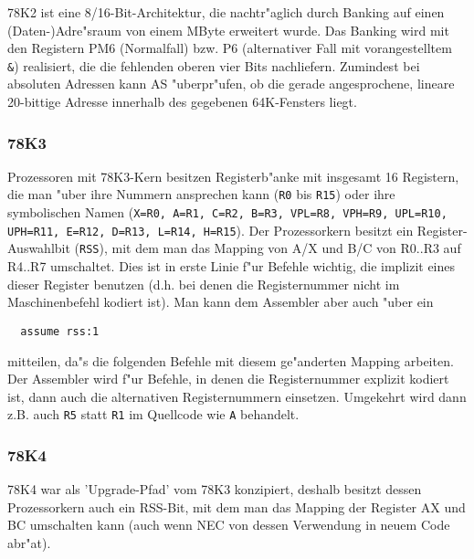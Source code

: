 \documentclass[12pt,a4paper,twoside]{report}
\newcommand{\tty}[1]{{\tt #1}}
\begin{document}
78K2 ist eine 8/16-Bit-Architektur, die nachtr"aglich durch Banking auf
einen (Daten-)Adre"sraum von einem MByte erweitert wurde.  Das Banking
wird mit den Registern PM6 (Normalfall) bzw. P6 (alternativer Fall mit
vorangestelltem \verb!&!) realisiert, die die fehlenden oberen vier Bits
nachliefern.  Zumindest bei absoluten Adressen kann AS "uberpr"ufen, ob
die gerade angesprochene, lineare 20-bittige Adresse innerhalb des
gegebenen 64K-Fensters liegt.


\subsubsection{78K3}

Prozessoren mit 78K3-Kern besitzen Registerb"anke mit insgesamt 16 Registern,
die man "uber ihre Nummern ansprechen kann (\tty{R0} bis \tty{R15}) oder ihre symbolischen
Namen (\tty{X=R0, A=R1, C=R2, B=R3, VPL=R8, VPH=R9, UPL=R10, UPH=R11, E=R12,
D=R13, L=R14, H=R15}).  Der Prozessorkern besitzt ein Register-Auswahlbit
(\tty{RSS}), mit dem man das Mapping von A/X und B/C von R0..R3 auf R4..R7
umschaltet.  Dies ist in erste Linie f"ur Befehle wichtig, die implizit eines
dieser Register benutzen (d.h. bei denen die Registernummer nicht im Maschinenbefehl
kodiert ist).  Man kann dem Assembler aber auch "uber ein

\begin{verbatim}
  assume rss:1
\end{verbatim}

mitteilen, da"s die folgenden Befehle mit diesem ge"anderten Mapping arbeiten.  Der
Assembler wird f"ur Befehle, in denen die Registernummer explizit kodiert ist, dann
auch die alternativen Registernummern einsetzen.  Umgekehrt wird dann z.B. auch
\tty{R5} statt \tty{R1} im Quellcode wie \tty{A} behandelt.


\subsubsection{78K4}

78K4 war als 'Upgrade-Pfad' vom 78K3 konzipiert, deshalb besitzt
dessen Prozessorkern auch ein RSS-Bit, mit dem man das Mapping
der Register AX und BC umschalten kann (auch wenn NEC von dessen
Verwendung in neuem Code abr"at).
\end{document}
